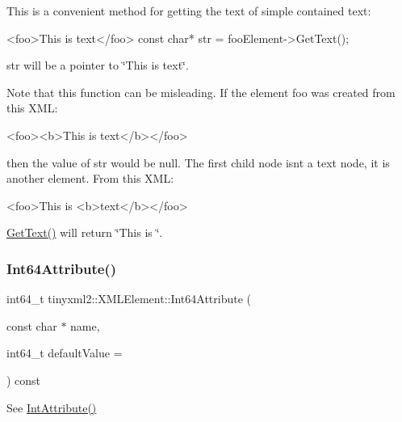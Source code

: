 This is a convenient method for getting the text of simple contained text\+: \begin{DoxyVerb}<foo>This is text</foo>
const char* str = fooElement->GetText();
\end{DoxyVerb}


\textquotesingle{}str\textquotesingle{} will be a pointer to \char`\"{}\+This is text\char`\"{}.

Note that this function can be misleading. If the element foo was created from this X\+ML\+: \begin{DoxyVerb}<foo><b>This is text</b></foo>
\end{DoxyVerb}


then the value of str would be null. The first child node isn\textquotesingle{}t a text node, it is another element. From this X\+ML\+: \begin{DoxyVerb}<foo>This is <b>text</b></foo>
\end{DoxyVerb}
 \hyperlink{classtinyxml2_1_1_x_m_l_element_a0fa5bea0a4daf3ddd503dcabb823eba6}{Get\+Text()} will return \char`\"{}\+This is \char`\"{}. \mbox{\label{classtinyxml2_1_1_x_m_l_element_a66d96972adecd816194191f13cc4a0a0}} 
\subsubsection{\texorpdfstring{Int64\+Attribute()}{Int64Attribute()}}
{\footnotesize\ttfamily int64\+\_\+t tinyxml2\+::\+X\+M\+L\+Element\+::\+Int64\+Attribute (\begin{DoxyParamCaption}\item[{const char $\ast$}]{name,  }\item[{int64\+\_\+t}]{default\+Value = {} }\end{DoxyParamCaption}) const}



See \hyperlink{classtinyxml2_1_1_x_m_l_element_a95a89b13bb14a2d4655e2b5b406c00d4}{Int\+Attribute()} 

\mbox{\label{classtinyxml2_1_1_x_m_l_element_aab6151f7e3b4c2c0a8234e262d7b6b8a}} 
